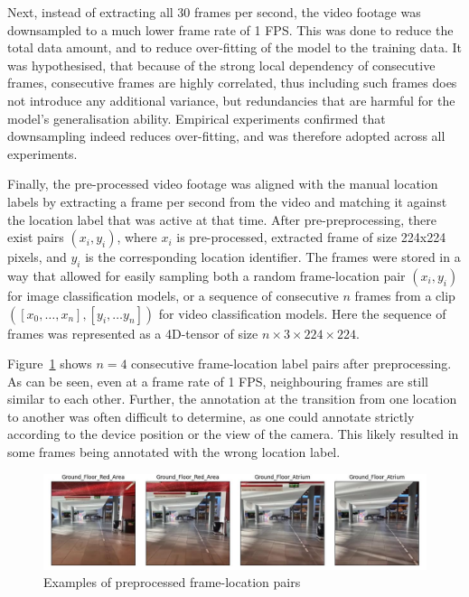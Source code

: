 \documentclass{article}
\begin{document}
  Next, instead of extracting all 30 frames per second, the video footage was
  downsampled to a much lower frame rate of 1 FPS. This was done to reduce the
  total data amount, and to reduce over-fitting of the model to the training
  data. It was hypothesised, that because of the strong local dependency of
  consecutive frames, consecutive frames are highly correlated, thus including
  such frames does not introduce any additional variance, but redundancies that
  are harmful for the model's generalisation ability. Empirical experiments
  confirmed that downsampling indeed reduces over-fitting, and was therefore
  adopted across all experiments.

  Finally, the pre-processed video footage was aligned with the manual location
  labels by extracting a frame per second from the video and matching it against
  the location label that was active at that time. After pre-preprocessing,
  there exist pairs $(x_i, y_i)$, where $x_i$ is pre-processed, extracted frame
  of size 224x224 pixels, and $y_i$ is the corresponding location identifier.
  The frames were stored in a way that allowed for easily sampling both a random
  frame-location pair $(x_i, y_i)$ for image classification models, or a
  sequence of consecutive $n$ frames from a clip $([x_0, \ldots, x_n], [y_i,
  \ldots y_n])$ for video classification models. Here the sequence of frames was
  represented as a 4D-tensor of size $n \times 3 \times 224 \times 224$.

  Figure~\ref{fig:preprocessed-data} shows $n=4$ consecutive frame-location
  label pairs after preprocessing. As can be seen, even at a frame rate of 1
  FPS, neighbouring frames are still similar to each other. Further, the
  annotation at the transition from one location to another was often difficult
  to determine, as one could annotate strictly according to the device position
  or the view of the camera. This likely resulted in some frames being annotated
  with the wrong location label.

  \begin{figure}[ht]
    \centering
    \includegraphics[width=\linewidth]{figures/data-example-batch.jpg}
    \caption{Examples of preprocessed frame-location pairs}
    \label{fig:preprocessed-data}
  \end{figure}
\end{document}
